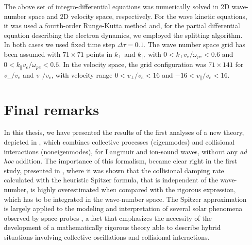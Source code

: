 \documentclass[12pt,a4paper,ruledheader]{report}
\begin{document}
The above set of integro-differential equations was numerically solved in
2D wave-number space and 2D velocity space, respectively. For the wave kinetic
equations, it was used a fourth-order Runge-Kutta method and, for the partial
differential equation describing the electron dynamics, we employed the
splitting algorithm. In both cases we used fixed time step $\Delta \tau=0.1$.
The wave number space grid has been assumed with $71\times 71$ points in
$k_{\perp}$ and $k_{\parallel}$, with $0<k_{\perp}v_e/\omega_{pe}<0.6$ and
$0<k_{\parallel}v_e/\omega_{pe}<0.6$. In the velocity space, the grid
configuration was  $71\times 141$ for $v_{\perp}/v_e$ and $v_{\parallel}/v_e$,
with velocity range $0<v_{\perp}/v_e<16$ and $-16<v_{\parallel}/v_e<16$.




\chapter{Final remarks}
\label{cha:final}
In this thesis, we have presented the results of the first analyses 
of a new
theory, depicted in , which combines collective processes
(eigenmodes) and collisional interactions (noneigenmodes), for Langmuir and
ion-sound waves, without any \emph{ad hoc} addition. The importance of this
formalism, became clear right in the first study, presented in ,
where it was shown that the collisional damping rate calculated with the heuristic
Spitzer formula, that is independent of the wave-number, is highly overestimated
when compared with the rigorous expression, which has to be integrated in the
wave-number space. The Spitzer approximation is largely applied to the modeling
and interpretation of several solar phenomena observed by space-probes \cite{
  Vinas2000,Hannah2009,ZVST11,KRB12,KF13,Reid2014,Reid2015}, a fact that
emphasizes the necessity of the development of a mathematically rigorous
theory able to describe hybrid situations involving collective oscillations
and collisional interactions.
\end{document}
